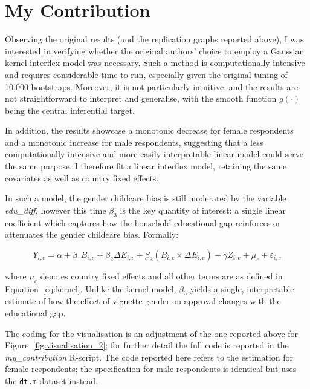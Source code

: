 \documentclass[12pt,letterpaper]{article}
\begin{document}
\vspace{1.5cm}

\section{My Contribution}

\vspace{0.5cm}
\noindent Observing the original results (and the replication graphs reported above), I was interested in verifying whether the original authors' choice to employ a Gaussian kernel interflex model was necessary. Such a method is computationally intensive and requires considerable time to run, especially given the original tuning of 10,000 bootstraps. Moreover, it is not particularly intuitive, and the results are not straightforward to interpret and generalise, with the smooth function $g(\cdot)$ being the central inferential target.

\noindent In addition, the results showcase a monotonic decrease for female respondents and a monotonic increase for male respondents, suggesting that a less computationally intensive and more easily interpretable linear model could serve the same purpose. I therefore fit a linear interflex model, retaining the same covariates as well as country fixed effects.

\noindent In such a model, the gender childcare bias is still moderated by the variable \emph{edu\_diff}, however this time $\beta_3$ is the key quantity of interest: a single linear coefficient which captures how the household educational gap reinforces or attenuates the gender childcare bias. Formally:

\begin{equation}
	Y_{i,c} = \alpha + \beta_1 B_{i,c} + \beta_2 \Delta E_{i,c} + 
	\beta_3 (B_{i,c} \times \Delta E_{i,c}) + \gamma Z_{i,c} + 
	\mu_c + \varepsilon_{i,c}
	\label{eq:linear}
\end{equation}

\noindent where $\mu_c$ denotes country fixed effects and all other terms are as defined in Equation~\ref{eq:kernel}. Unlike the kernel model, $\beta_3$ yields a single, interpretable estimate of how the effect of vignette gender on approval changes with the educational gap.

\noindent The coding for the visualisation is an adjustment of the one reported above for Figure~\ref{fig:visualisation_2}; for further detail the full code is reported in the \emph{my\_contribution} R-script. The code reported here refers to the estimation for female respondents; the specification for male respondents is identical but uses the \texttt{dt.m} dataset instead.
\end{document}
